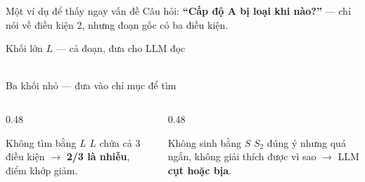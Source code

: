 \documentclass[aspectratio=169,10pt]{beamer}
\begin{document}
\begin{frame}{Một ví dụ để thấy ngay vấn đề}
  {\footnotesize Câu hỏi: \textbf{``Cấp độ A bị loại khi nào?''} --- chỉ nói về điều kiện 2, nhưng đoạn gốc có ba điều kiện.}
  \begin{block}{\small Khối lớn $L$ --- cả đoạn, đưa cho LLM đọc}
    \footnotesize
    \\[1pt]
    \\[1pt]
  \end{block}
  \begin{block}{\small Ba khối nhỏ --- đưa vào chỉ mục để tìm}
    \centering\footnotesize
     \quad
    \textbf{} \quad
  \end{block}
  \begin{columns}[T]
    \begin{column}{0.48\textwidth}
      \begin{alertblock}{\small Không tìm bằng $L$}
        \footnotesize $L$ chứa cả 3 điều kiện $\rightarrow$ \textbf{2/3 là nhiễu}, điểm khớp giảm.
      \end{alertblock}
    \end{column}
    \begin{column}{0.48\textwidth}
      \begin{alertblock}{\small Không sinh bằng $S$}
        \footnotesize $S_2$ đúng ý nhưng quá ngắn, không giải thích được vì sao
        $\rightarrow$ LLM \textbf{cụt hoặc bịa}.
      \end{alertblock}
    \end{column}
  \end{columns}
\end{frame}
\end{document}
